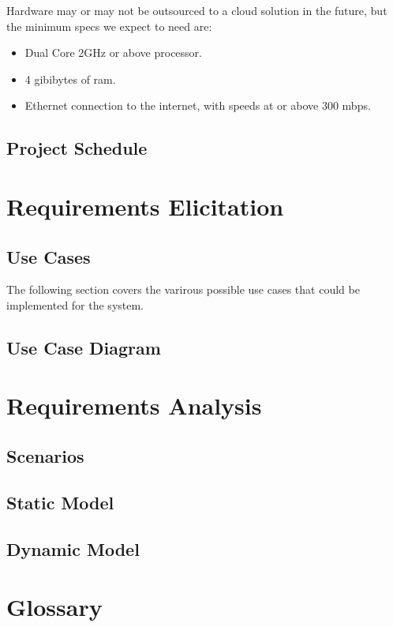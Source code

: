 \documentclass[letter,12pt]{report}
\begin{document}
Hardware may or may not be outsourced to a cloud solution in the future,
but the minimum specs we expect to need are:

\begin{itemize}
\item Dual Core 2GHz or above processor.
\item 4 gibibytes of ram.
\item Ethernet connection to the internet, with speeds at or above 300 mbps.
\end{itemize}


\section{Project Schedule}






\chapter{Requirements Elicitation}

\section{Use Cases}
The following section covers the varirous possible use cases
that could be implemented for the system.

\section{Use Case Diagram}

\chapter{Requirements Analysis}

\section{Scenarios}

\section{Static Model}

\section{Dynamic Model}

\chapter{Glossary}
\end{document}
